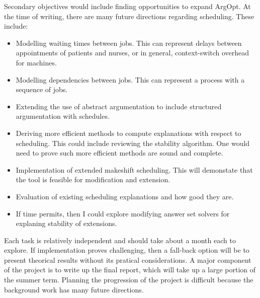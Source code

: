 Secondary objectives would include finding opportunities to expand ArgOpt. At the time of writing, there are many future directions regarding scheduling. These include:
\begin{itemize}
	\item Modelling waiting times between jobs. This can represent delays between appointments of patients and nurses, or in general, context-switch overhead for machines.
	\item Modelling dependencies between jobs. This can represent a process with a sequence of jobs.
	\item Extending the use of abstract argumentation to include structured argumentation with schedules.
	\item Deriving more efficient methods to compute explanations with respect to scheduling. This could include reviewing the stability algorithm. One would need to prove such more efficient methods are sound and complete.
	\item Implementation of extended makeshift scheduling. This will demonstate that the tool is feasible for modification and extension.
	\item Evaluation of existing scheduling explanations and how good they are.
	\item If time permits, then I could explore modifying answer set solvers for explaning stability of extensions.
\end{itemize}

Each task is relatively independent and should take about a month each to explore. If implementation proves challenging, then a fall-back option will be to present theorical results without its pratical considerations. A major component of the project is to write up the final report, which will take up a large portion of the summer term. Planning the progression of the project is difficult because the background work has many future directions.